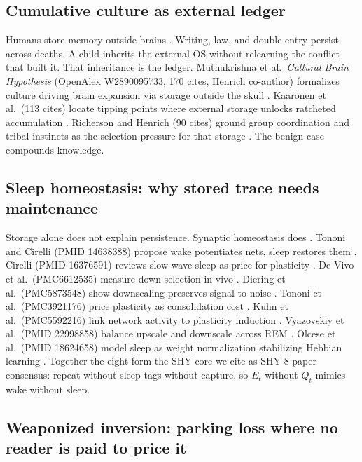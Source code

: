 \documentclass[11pt]{article}
\begin{document}
\subsection{Cumulative culture as external ledger}
Humans store memory outside brains \citep{tomasello,henrich,muthukrishna2018,kaaronen2021}. Writing, law, and double entry persist across deaths. A child inherits the external OS without relearning the conflict that built it. That inheritance is the ledger. Muthukrishna et al.\ \textit{Cultural Brain Hypothesis} (OpenAlex W2890095733, 170 cites, Henrich co-author) formalizes culture driving brain expansion via storage outside the skull \citep{muthukrishna2018}. Kaaronen et al.\ (113 cites) locate tipping points where external storage unlocks ratcheted accumulation \citep{kaaronen2021}. Richerson and Henrich (90 cites) ground group coordination and tribal instincts as the selection pressure for that storage \citep{richerson2012}. The benign case compounds knowledge.

\subsection{Sleep homeostasis: why stored trace needs maintenance}
Storage alone does not explain persistence. Synaptic homeostasis does \citep{tononi2003}. Tononi and Cirelli (PMID 14638388) propose wake potentiates nets, sleep restores them \citep{tononi2003}. Cirelli (PMID 16376591) reviews slow wave sleep as price for plasticity \citep{cirelli2006}. De Vivo et al.\ (PMC6612535) measure down selection in vivo \citep{devivo2017}. Diering et al.\ (PMC5873548) show downscaling preserves signal to noise \citep{diering2017}. Tononi et al.\ (PMC3921176) price plasticity as consolidation cost \citep{tononi2014}. Kuhn et al.\ (PMC5592216) link network activity to plasticity induction \citep{kuhn2018}. Vyazovskiy et al.\ (PMID 22998858) balance upscale and downscale across REM \citep{vyazovskiy2011}. Olcese et al.\ (PMID 18624658) model sleep as weight normalization stabilizing Hebbian learning \citep{olcese2010}. Together the eight form the SHY core we cite as SHY 8-paper consensus: repeat without sleep tags without capture, so $E_t$ without $Q_t$ mimics wake without sleep.

\subsection{Weaponized inversion: parking loss where no reader is paid to price it}
\end{document}
